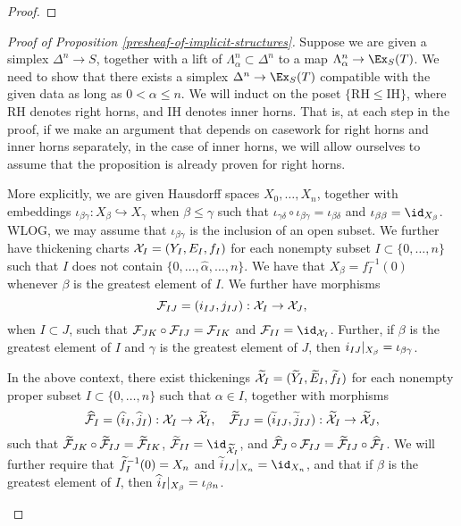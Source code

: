 \begin{proof}
\jake{[To be done.]}
\end{proof}


\begin{proof}[Proof of Proposition \ref{presheaf-of-implicit-structures}]

Suppose we are given a simplex $\Delta^n \to S$, together with a lift of $\Lambda^n_\alpha \subset \Delta^n$ to a map $\Lambda^n_\alpha \to \Ex_S(T)$. We need to show that there exists a simplex $\Delta^n \to \Ex_S(T)$ compatible with the given data as long as $0 < \alpha \leq n$. We will induct on the poset $\{ \mathrm{RH} \leq \mathrm{IH} \}$, where $\mathrm{RH}$ denotes right horns, and $\mathrm{IH}$ denotes inner horns. That is, at each step in the proof, if we make an argument that depends on casework for right horns and inner horns separately, in the case of inner horns, we will allow ourselves to assume that the proposition is already proven for right horns.

More explicitly, we are given Hausdorff spaces $X_0, \dots, X_n$, together with embeddings $\iota_{\beta \gamma}: X_\beta \hookrightarrow X_\gamma$ when $\beta \leq \gamma$ such that $\iota_{\gamma \delta} \circ \iota_{\beta \gamma} = \iota_{\beta \delta}$ and $\iota_{\beta \beta} = \id_{X_\beta}$. WLOG, we may assume that $\iota_{\beta \gamma}$ is the inclusion of an open subset. We further have thickening charts $\mathcal X_I = (Y_I, E_I, f_I)$ for each nonempty subset $I \subset \{0, \dots, n\}$ such that $I$ does not contain $\{0, \dots, \widehat{\alpha}, \dots, n\}$. We have that $X_\beta = f_I^{-1}(0)$ whenever $\beta$ is the greatest element of $I$. We further have morphisms
\[ \mathcal F_{IJ} = (i_{I J}, j_{I J}): \mathcal X_I \to \mathcal X_J, \]
when $I \subset J$, such that $\mathcal F_{JK} \circ \mathcal F_{IJ} = \mathcal F_{IK}$ and $\cF_{II} = \id_{\cX_I}$. Further, if $\beta$ is the greatest element of $I$ and $\gamma$ is the greatest element of $J$, then ${i_{I J}|_{X_\beta}} = \iota_{\beta \gamma}$.

\begin{lemma}\label{existence-of-good-thickenings}
In the above context, there exist thickenings $\widetilde {\mathcal X}_I = (\widetilde Y_I, \widetilde E_I, \widetilde f_I)$ for each nonempty proper subset $I \subset \{0, \dots, n\}$ such that $\alpha \in I$, together with morphisms
\[ \widehat {\mathcal F}_I = (\widehat i_I, \widehat j_I): \mathcal X_I \to \widetilde {\mathcal X}_I, \quad \widetilde {\mathcal F}_{IJ} = (\widetilde i_{IJ}, \widetilde j_{IJ}) : \widetilde {\mathcal X}_I \to \widetilde {\mathcal X}_J, \]
such that $\widetilde {\mathcal F}_{JK} \circ \widetilde {\mathcal F}_{IJ} = \widetilde {\mathcal F}_{IK}$, $\wt \cF_{II} = \id_{\wt \cX_I}$, and $\widehat {\mathcal F}_J \circ \mathcal F_{IJ} = \widetilde {\mathcal F}_{IJ} \circ \widehat {\mathcal F}_I$. We will further require that $\widetilde f_I^{-1}(0) = X_n$ and $\rest{\wt i_{IJ}}{X_n} = \id_{X_n}$, and that if $\beta$ is the greatest element of $I$, then ${\widehat i_I|_{X_\beta}} = \iota_{\beta n}$.
\end{lemma}


\end{proof}
